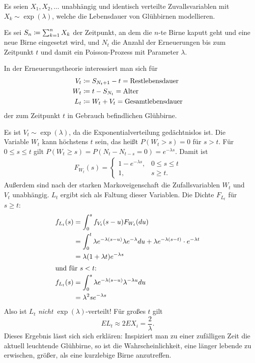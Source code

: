 \documentclass[a4paper,twoside,DIV15,BCOR12mm]{scrbook}
\begin{document}
\begin{beispiel}
Es seien $X_1,X_2,\ldots$ unabhängig und identisch verteilte Zuvallsvariablen mit $X_k\sim \exp(\lambda)$, welche die Lebensdauer von Glühbirnen modellieren.

Es sei $S_n \da \sum_{k=1}^n X_k$ der Zeitpunkt, an dem die $n$-te Birne kaputt geht und eine neue Birne eingesetzt wird, und $N_t$ die Anzahl der Erneuerungen bis zum Zeitpunkt $t$ und damit ein Poisson-Prozess mit Parameter $\lambda$.

In der Erneuerungstheorie interessiert man sich für 
\begin{align*}
V_t &\da S_{N_t+1}-t = \text{Restlebensdauer} \\
W_t &\da t- S_{N_t} = \text{Alter} \\
L_t &\da  W_t + V_t = \text{Gesamtlebensdauer}
\end{align*}
der zum Zeitpunkt $t$ in Gebrauch befindlichen Glühbirne.

Es ist $V_t \sim \exp(\lambda)$, da die Exponentialverteilung gedächtnislos ist. Die Variable $W_t$ kann höchstens $t$ sein, das heißt $P(W_t > s) = 0$ für $s>t$. Für $0\le s \le t$ gilt $P(W_t \ge s) = P(N_t-N_{t-s} = 0) = e^{-\lambda s}$. Damit ist
\begin{align*}
F_{W_t}(s) = 
\begin{cases}
1-e^{-\lambda s},& 0\le s \le t \\
1, & s\ge t.
\end{cases}
\end{align*}
Außerdem sind nach der starken Markoveigenschaft die Zufallsvariablen $W_t$ und $V_t$ unabhängig. $L_t$ ergibt sich als Faltung dieser Variablen. Die Dichte $F_{L_t}$ für $s\ge t$:
\begin{align*}
f_{L_t}(s) &= \int_0^s f_{V_t}(s-u)F_{W_t}(du) \\
&= \int_0^t \lambda e^{-\lambda(s-u)}\lambda e^{-\lambda} du + \lambda e^{-\lambda(s-t)}\cdot e^{-\lambda t} \\
&= \lambda (1+\lambda t)e^{-\lambda s}\\
\intertext{und für $s < t$:}
f_{L_t}(s) &= \int_0^s \lambda e^{-\lambda(s-u)}\lambda ^{-\lambda u}du \\
&= \lambda ^2 s e^{-\lambda s}
\end{align*}
Also ist $L_t$ \emph{nicht} $\exp(\lambda)$-verteilt! Für großes $t$ gilt
\[
EL_{t} \approx 2 EX_i=\frac 2 {\lambda}.
\]
Dieses Ergebnis lässt sich sich erklären: Inspiziert man zu einer zufälligen Zeit die aktuell leuchtende Glühbirne, so ist die Wahrscheinlichkeit, eine länger lebende zu erwischen, größer, als eine kurzlebige Birne anzutreffen.
\end{beispiel}
\end{document}

